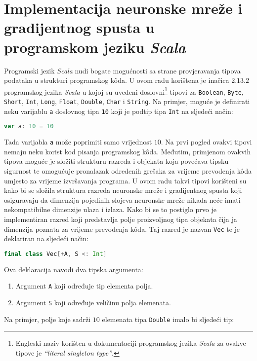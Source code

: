 \chapter{Implementacija neuronske mreže i gradijentnog spusta u programskom jeziku \emph{Scala}}
\label{ch:implementacija-neuronske-mreze-i-gradijentnog-spusta-u-programskom-jeziku-scala}
Programski jezik \emph{Scala} nudi bogate mogućnosti sa strane provjeravanja tipova podataka u strukturi programskog
kôda. U ovom radu korištena je inačica $2.13.2$ programskog jezika \emph{Scala} u kojoj su uvedeni
doslovni\footnote{Engleski naziv korišten u dokumentaciji programskog jezika \emph{Scala} za ovakve tipove je
\emph{``literal singleton type''}.} tipovi za \texttt{Boolean}, \texttt{Byte}, \texttt{Short}, \texttt{Int},
\texttt{Long}, \texttt{Float}, \texttt{Double}, \texttt{Char} i \texttt{String}. Na primjer, moguće je definirati neku
varijablu \texttt{a} doslovnog tipa \texttt{10} koji je podtip tipa \texttt{Int} na sljedeći način:
\begin{lstlisting}[language=scala,label={lst:lstlisting}]
    var a: 10 = 10
\end{lstlisting}
Tada varijabla \texttt{a} može poprimiti samo vrijednost $10$. Na prvi pogled ovakvi tipovi nemaju neku korist kod
pisanja programskog kôda. Međutim, primjenom ovakvih tipova moguće je složiti strukturu razreda i objekata koja povećava
tipsku sigurnost te omogućuje pronalazak određenih grešaka za vrijeme prevođenja kôda umjesto za vrijeme izvršavanja
programa. U ovom radu takvi tipovi korišteni su kako bi se složila struktura razreda neuronske mreže i gradijentnog
spusta koji osiguravaju da dimenzija pojedinih slojeva neuronske mreže nikada neće imati nekompatibilne dimenzije ulaza
i izlaza. Kako bi se to postiglo prvo je implementiran razred koji predstavlja polje proizvoljnog tipa objekata čija ja
dimenzija poznata za vrijeme prevođenja kôda. Taj razred je nazvan \texttt{Vec} te je deklariran na sljedeći način:
\begin{lstlisting}[language=scala,label={lst:lstlisting2}]
    final class Vec[+A, S <: Int]
\end{lstlisting}
Ova deklaracija navodi dva tipska argumenta:
\begin{enumerate}
    \item Argument \texttt{A} koji određuje tip elementa polja.
    \item Argument \texttt{S} koji određuje veličinu polja elemenata.
\end{enumerate}
Na primjer, polje koje sadrži $10$ elemenata tipa \texttt{Double} imalo bi sljedeći tip:
